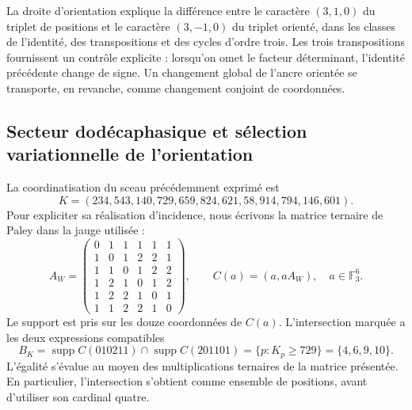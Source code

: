 La droite d’orientation explique la différence entre le caractère
\((3,1,0)\) du triplet de positions et le caractère \((3,-1,0)\)
du triplet orienté, dans les classes de l’identité, des transpositions et des cycles
d’ordre trois. Les trois transpositions fournissent un contrôle explicite :
lorsqu’on omet le facteur déterminant, l’identité précédente change de signe.
Un changement global de l’ancre orientée se transporte, en revanche, comme changement
conjoint de coordonnées.

\subsection{Secteur dodécaphasique et sélection variationnelle de l’orientation}

La coordinatisation du sceau précédemment exprimé est
\begin{equation}
 K=(234,543,140,729,659,824,621,58,914,794,146,601).
 \label{eq:ii-witt-K-marked}
\end{equation}
Pour expliciter sa réalisation d’incidence, nous écrivons la matrice ternaire
de Paley dans la jauge utilisée :
\[
 A_W=\begin{pmatrix}
 0&1&1&1&1&1\\
 1&0&1&2&2&1\\
 1&1&0&1&2&2\\
 1&2&1&0&1&2\\
 1&2&2&1&0&1\\
 1&1&2&2&1&0
 \end{pmatrix},
 \qquad C(a)=(a,aA_W),\quad a\in\mathbb F_3^6.
\]
Le support est pris sur les douze coordonnées de \(C(a)\).
L’intersection marquée a les deux expressions compatibles
\begin{equation}
 B_K=\operatorname{supp}C(010211)\cap\operatorname{supp}C(201101)
     =\{p:K_p\ge729\}=\{4,6,9,10\}.
 \label{eq:ii-witt-B-marked}
\end{equation}
L’égalité s’évalue au moyen des multiplications ternaires de la matrice
présentée. En particulier, l’intersection s’obtient comme ensemble de
positions, avant d’utiliser son cardinal quatre.

